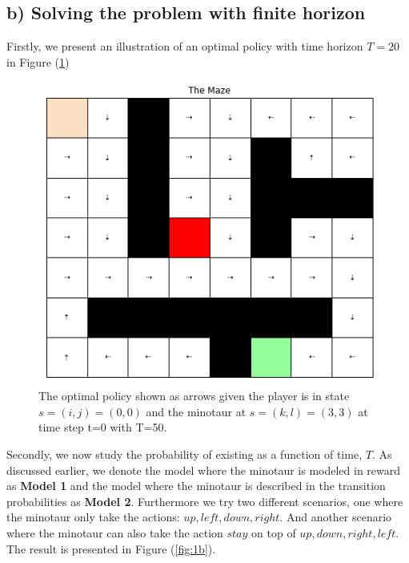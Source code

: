 \documentclass{article}
\begin{document}
\subsection{b) Solving the problem with finite horizon}
Firstly, we present an illustration of an optimal policy with time horizon $T=20$ in Figure (\ref{fig:1b-optpol})

\begin{figure}[ht]
  \centering
  \includegraphics[width=0.9\linewidth]{img/optimalpolicyT20.png}
  \caption{The optimal policy shown as arrows given the player is in state $s=(i,j)=(0,0)$ and the minotaur at $s=(k,l)=(3,3)$  at time step t=0 with T=50.}
  \label{fig:1b-optpol}
\end{figure}

Secondly, we now study the probability of existing as a function of time, $T$. As discussed earlier, we denote the model where the minotaur is modeled in reward as \textbf{Model 1} and the model where the minotaur is described in the transition probabilities as \textbf{Model 2}. Furthermore we try two different scenarios, one where the minotaur only take the actions: $up, left, down, right$. And another scenario where the minotaur can also take the action $stay$ on top of $up, down, right, left$. The result is presented in Figure (\ref{fig:1b}).
\end{document}
